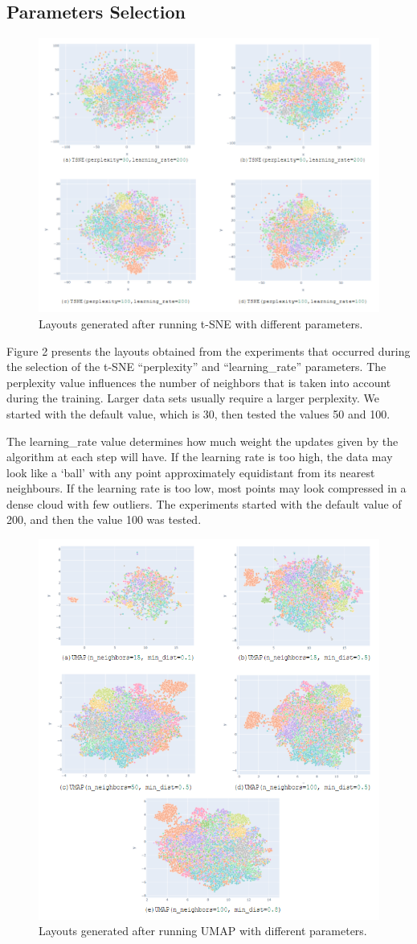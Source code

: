 \documentclass[conference]{IEEEtran}
\begin{document}
\subsection{Parameters Selection}

\begin{figure}[htbp]
\centering
\includegraphics[width=.45\textwidth]{parametros_tsne.png}
\caption{Layouts generated after running t-SNE with different parameters.}
\label{fig}
\end{figure}

Figure 2 presents the layouts obtained from the experiments that occurred during the selection of the t-SNE “perplexity” and “learning\_rate” parameters. The perplexity value influences the number of neighbors that is taken into account during the training. Larger data sets usually require a larger perplexity. We started with the default value, which is 30, then tested the values 50 and 100. 

The learning\_rate value determines how much weight the updates given by the algorithm at each step will have.  If the learning rate is too high, the data may look like a ‘ball’ with any point approximately equidistant from its nearest neighbours. If the learning rate is too low, most points may look compressed in a dense cloud with few outliers. The experiments started with the default value of 200, and then the value 100 was tested.

\begin{figure}[htbp]
\centering
\includegraphics[width=.45\textwidth]{parametros_umap2.png}
\caption{Layouts generated after running UMAP with different parameters.}
\label{fig}
\end{figure}
\end{document}
